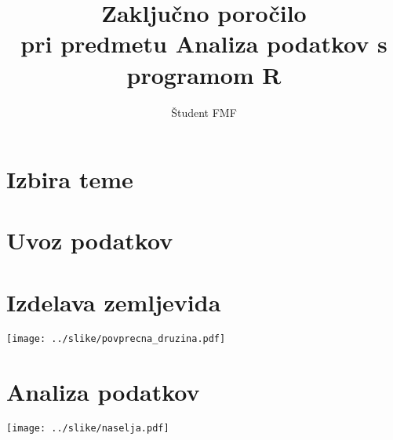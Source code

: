 \documentclass[11pt,a4paper]{article}
\begin{document}
\title{Zaključno poročilo \\
pri predmetu Analiza podatkov s programom R}
\author{Študent FMF}
\maketitle

\section{Izbira teme}

\section{Uvoz podatkov}

\section{Izdelava zemljevida}

\texttt{[image: ../slike/povprecna\_druzina.pdf]}

\section{Analiza podatkov}

\texttt{[image: ../slike/naselja.pdf]}
\end{document}
